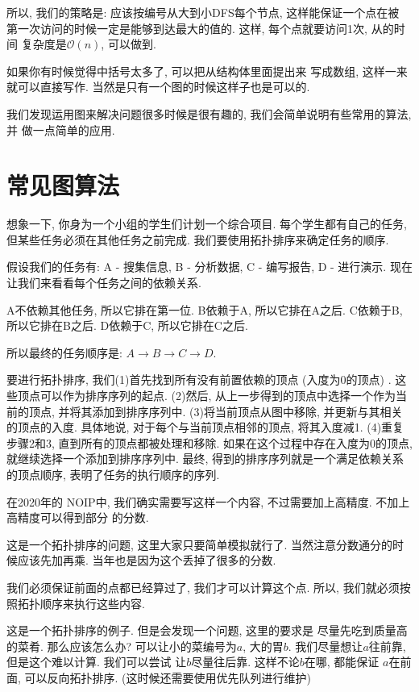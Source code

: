 所以, 我们的策略是: 应该按编号从大到小DFS每个节点, 这样能保证一个点在被
第一次访问的时候一定是能够到达最大的值的. 这样, 每个点就要访问1次, 从的时间
复杂度是$\mathcal O(n)$, 可以做到. 

如果你有时候觉得中括号太多了, 可以把从结构体里面提出来
写成数组, 这样一来就可以直接写作. 
当然是只有一个图的时候这样子也是可以的. 



我们发现运用图来解决问题很多时候是很有趣的, 我们会简单说明有些常用的算法, 并
做一点简单的应用. 



\section{常见图算法}

 想象一下, 你身为一个小组的学生们计划一个综合项目. 
每个学生都有自己的任务, 但某些任务必须在其他任务之前完成. 
我们要使用拓扑排序来确定任务的顺序. 

假设我们的任务有: A - 搜集信息, B - 分析数据, C - 编写报告, D - 进行演示. 
现在让我们来看看每个任务之间的依赖关系. 

A不依赖其他任务, 所以它排在第一位. 
B依赖于A, 所以它排在A之后. 
C依赖于B, 所以它排在B之后. 
D依赖于C, 所以它排在C之后. 

所以最终的任务顺序是: $A \rightarrow  B \rightarrow  C \rightarrow  D$. 

要进行拓扑排序, 我们(1)首先找到所有没有前置依赖的顶点 (入度为0的顶点) . 
这些顶点可以作为排序序列的起点. (2)然后, 从上一步得到的顶点中选择一个作为当
前的顶点, 并将其添加到排序序列中. (3)将当前顶点从图中移除, 
并更新与其相关的顶点的入度. 具体地说, 对于每个与当前顶点相邻的顶点, 将其入度减1. 
(4)重复步骤2和3, 直到所有的顶点都被处理和移除. 
如果在这个过程中存在入度为0的顶点, 就继续选择一个添加到排序序列中. 
最终, 得到的排序序列就是一个满足依赖关系的顶点顺序, 表明了任务的执行顺序的序列.

在2020年的
NOIP中, 我们确实需要写这样一个内容, 不过需要加上高精度. 不加上高精度可以得到部分
的分数. 

 这是一个拓扑排序的问题, 这里大家只要简单模拟就行了. 
当然注意分数通分的时候应该先加再乘. 当年也是因为这个丢掉了很多的分数. 

 我们必须保证前面的点都已经算过了, 我们才可以计算这个点. 
所以, 我们就必须按照拓扑顺序来执行这些内容.

 这是一个拓扑排序的例子. 但是会发现一个问题, 这里的要求是
尽量先吃到质量高的菜肴. 那么应该怎么办? 可以让小的菜编号为$a$, 
大的胃$b$. 我们尽量想让$a$往前靠, 但是这个难以计算. 我们可以尝试
让$b$尽量往后靠. 这样不论$b$在哪, 都能保证
$a$在前面, 可以反向拓扑排序. (这时候还需要使用优先队列进行维护) 


